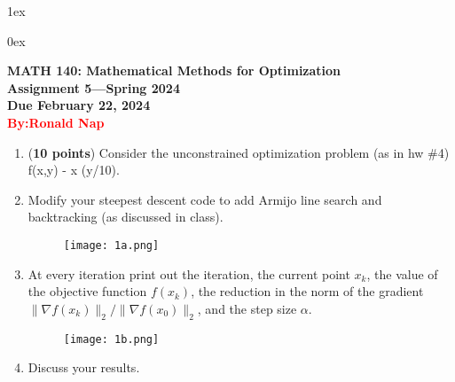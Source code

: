 \newcommand{\p}{\partial}
\newcommand{\bs}{\boldsymbol}

\usepackage{amssymb}


\parskip 1ex

\parindent 0ex


\pagestyle{empty}

\begin{center}
{\large {\bf MATH 140: Mathematical Methods for Optimization}}\\
{\bf Assignment 5---Spring 2024}\\
{\bf Due February 22, 2024} \\
{\textcolor{red}{\bf By:Ronald Nap}}

\end{center}

\begin{enumerate}

  \item ({\bf 10 points}) Consider the unconstrained optimization
    problem (as in hw \#4)
    \bdm \min f(x,y) \equiv - \cos x \cos
    (y/10).  \edm \ben

    
\item Modify your steepest descent code to add Armijo line search and
  backtracking (as discussed in class).

    \begin{figure}[H]
    \centering
    \texttt{[image: 1a.png]} 
    \end{figure}

  
\item At every iteration print out the iteration, the current point
  $x_k$, the value of the objective function $f(x_k)$, the reduction
  in the norm of the gradient $ \|\nabla f(x_k)\|_2/ \|\nabla
  f(x_0)\|_2$, and the step size $\alpha$.

    \begin{figure}[H]
    \centering
    \texttt{[image: 1b.png]} 
    \end{figure}

  
\item Discuss your results.


\end{enumerate}

